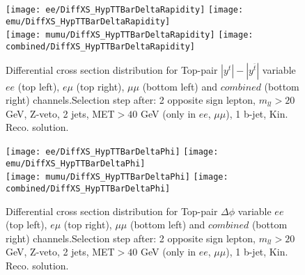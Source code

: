 \clearpage
\newpage

\begin{figure}
  \texttt{[image: ee/DiffXS\_HypTTBarDeltaRapidity]}
  \texttt{[image: emu/DiffXS\_HypTTBarDeltaRapidity]}\\
  \texttt{[image: mumu/DiffXS\_HypTTBarDeltaRapidity]}
  \texttt{[image: combined/DiffXS\_HypTTBarDeltaRapidity]}
\caption{Differential cross section distribution for  Top-pair $|y^t| - |y^{\bar{t}}|$ variable  $ee$ (top left), $e\mu$ (top right), $\mu\mu$ (bottom left) and $combined$ (bottom right) channels.\newline Selection step after: 2 opposite sign lepton, $m_{ll}>20$ GeV, Z-veto, 2 jets, MET$>40$ GeV (only in $ee$, $\mu\mu$), 1 b-jet, Kin. Reco. solution.}
\end{figure}

\clearpage
\newpage

\begin{figure}
  \texttt{[image: ee/DiffXS\_HypTTBarDeltaPhi]}
  \texttt{[image: emu/DiffXS\_HypTTBarDeltaPhi]}\\
  \texttt{[image: mumu/DiffXS\_HypTTBarDeltaPhi]}
  \texttt{[image: combined/DiffXS\_HypTTBarDeltaPhi]}
\caption{Differential cross section distribution for  Top-pair $\Delta \phi$ variable  $ee$ (top left), $e\mu$ (top right), $\mu\mu$ (bottom left) and $combined$ (bottom right) channels.\newline Selection step after: 2 opposite sign lepton, $m_{ll}>20$ GeV, Z-veto, 2 jets, MET$>40$ GeV (only in $ee$, $\mu\mu$), 1 b-jet, Kin. Reco. solution.}
\end{figure}
